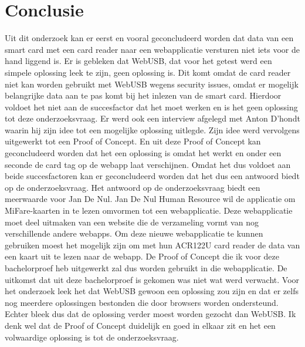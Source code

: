 
\chapter{Conclusie}%
\label{ch:conclusie}


Uit dit onderzoek kan er eerst en vooral geconcludeerd worden dat data van een smart card met een card reader naar een webapplicatie versturen niet iets voor de hand liggend is. Er is gebleken dat WebUSB, dat voor het getest werd een simpele oplossing leek te zijn, geen oplossing is. Dit komt omdat de card reader niet kan worden gebruikt met WebUSB wegens security issues, omdat er mogelijk belangrijke data aan te pas komt bij het inlezen van de smart card. Hierdoor voldoet het niet aan de succesfactor dat het moet werken en is het geen oplossing tot deze onderzoeksvraag.
Er werd ook een interview afgelegd met Anton D'hondt waarin hij zijn idee tot een mogelijke oplossing uitlegde. Zijn idee werd vervolgens uitgewerkt tot een Proof of Concept. En uit deze Proof of Concept kan geconcludeerd worden dat het een oplossing is omdat het werkt en onder een seconde de card tag op de webapp laat verschijnen. Omdat het dus voldoet aan beide succesfactoren kan er geconcludeerd worden dat het dus een antwoord biedt op de onderzoeksvraag.
Het antwoord op de onderzoeksvraag biedt een meerwaarde voor Jan De Nul. Jan De Nul Human Resource wil de applicatie om MiFare-kaarten in te lezen omvormen tot een webapplicatie. Deze webapplicatie moet deel uitmaken van een website die de verzameling vormt van nog verschillende andere webapps. Om deze nieuwe webapplicatie te kunnen gebruiken moest het mogelijk zijn om met hun ACR122U card reader de data van een kaart uit te lezen naar de webapp. De Proof of Concept die ik voor deze bachelorproef heb uitgewerkt zal dus worden gebruikt in die webapplicatie.
De uitkomst dat uit deze bachelorproef is gekomen was niet wat werd verwacht. Voor het onderzoek leek het dat WebUSB gewoon een oplossing zou zijn en dat er zelfs nog meerdere oplossingen bestonden die door browsers worden ondersteund. Echter bleek dus dat de oplossing verder moest worden gezocht dan WebUSB. Ik denk wel dat de Proof of Concept duidelijk en goed in elkaar zit en het een volwaardige oplossing is tot de onderzoeksvraag.

